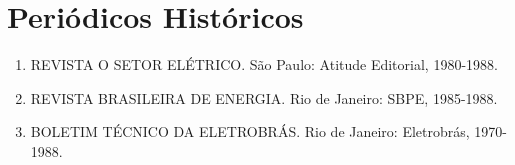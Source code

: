 \documentclass[12pt,a4paper]{report}
\begin{document}
\section*{Periódicos Históricos}
\begin{enumerate}[leftmargin=*]
    \item REVISTA O SETOR ELÉTRICO. São Paulo: Atitude Editorial, 1980-1988.
    
    \item REVISTA BRASILEIRA DE ENERGIA. Rio de Janeiro: SBPE, 1985-1988.
    
    \item BOLETIM TÉCNICO DA ELETROBRÁS. Rio de Janeiro: Eletrobrás, 1970-1988.
\end{enumerate}
\end{document}
